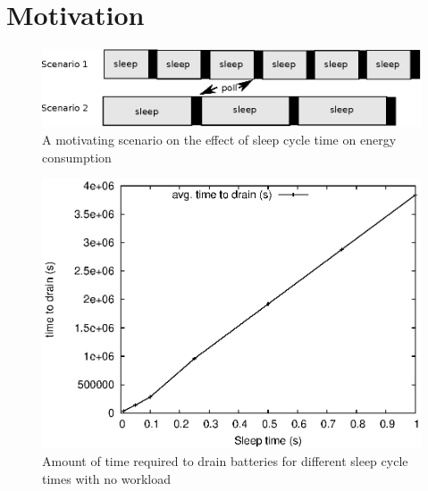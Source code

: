 \section{Motivation} \label{sec:motivation}


\begin{figure}[t]
\centering
\includegraphics[scale=0.65]{figures/drawing.eps}
\caption{A motivating scenario on the effect of sleep cycle time on energy consumption}
\label{fig:motivating}
\end{figure}

\begin{figure}[t]
\centering
\includegraphics[scale=0.65]{figures/longevity.eps}
\caption{Amount of time required to drain batteries for different sleep cycle times with no workload}
\label{fig:longevity}
\end{figure}

